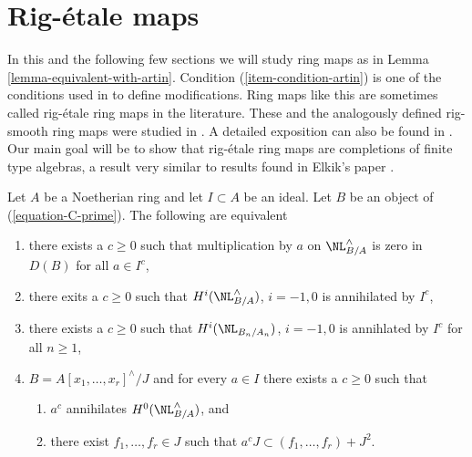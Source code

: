 \section{Rig-\'etale maps}
\label{section-rig-etale}

\noindent
In this and the following few sections we will study ring maps as
in Lemma \ref{lemma-equivalent-with-artin}. Condition
(\ref{item-condition-artin}) is one of the conditions used in
\cite{ArtinII} to define modifications. Ring maps like this are sometimes
called rig-\'etale ring maps in the literature. These and
the analogously defined rig-smooth ring maps were studied
in \cite{Elkik}. A detailed exposition can also be found in
\cite{Abbes}. Our main goal will be to show that rig-\'etale
ring maps are completions of finite type algebras, a result
very similar to results found in Elkik's paper \cite{Elkik}.

\begin{lemma}
\label{lemma-equivalent-with-artin}
Let $A$ be a Noetherian ring and let $I \subset A$ be an ideal.
Let $B$ be an object of (\ref{equation-C-prime}). The following are equivalent
\begin{enumerate}
\item
\label{item-zero-on-NL}
there exists a $c \geq 0$ such that multiplication by $a$
on $\NL^\wedge_{B/A}$ is zero in $D(B)$ for all $a \in I^c$,
\item
\label{item-zero-on-cohomology-NL}
there exits a $c \geq 0$ such that $H^i(\NL^\wedge_{B/A})$, $i = -1, 0$ is
annihilated by $I^c$,
\item
\label{item-zero-on-cohomology-NL-truncations}
there exists a $c \geq 0$ such that $H^i(\NL_{B_n/A_n})$, $i = -1, 0$ is
annihlated by $I^c$ for all $n \geq 1$,
\item
\label{item-condition-artin}
$B = A[x_1, \ldots, x_r]^\wedge/J$ and
for every $a \in I$ there exists a $c \geq 0$ such that
\begin{enumerate}
\item $a^c$ annihilates $H^0(\NL^\wedge_{B/A})$, and
\item there exist $f_1, \ldots, f_r \in J$ such that
$a^c J \subset (f_1, \ldots, f_r) + J^2$.
\end{enumerate}
\end{enumerate}
\end{lemma}

